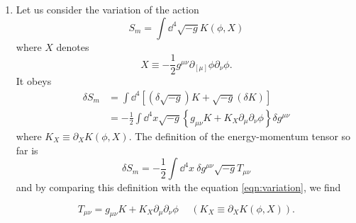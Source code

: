 \documentclass[a4paper,pdftex,10pt]{article}
\begin{document}
\maketitle

\begin{enumerate}
  \item
        Let us consider the variation of the action
        \begin{equation}
          S_{m}
          =
          \int\dd^4 \sqrt{-g}K(\phi,X)
        \end{equation}
        where $X$ denotes
        \begin{equation}
          X
          \equiv
          -
          \frac{1}{2}g^{\mu\nu}\partial_[\mu]\phi\partial_{\nu}\phi
          .
        \end{equation}
        It obeys
        \begin{align}
          \delta S_{m}
           & =
          \int\dd^4
          \left[
            (\delta\sqrt{-g})K
            +
            \sqrt{-g}(\delta K)
            \right]
          \nonumber
          \\
           & =
          -\frac{1}{2}
          \int\dd^4 x
          \sqrt{-g}
          \left\{
          g_{\mu\nu}K
          +
          K_{X}\partial_{\mu}\partial_{\nu}\phi
          \right\}
          \delta g^{\mu\nu}
          \label{eqn:variation}
        \end{align}
        where $K_{X}\equiv \partial_{X}K(\phi,X)$. The definition of the energy-momentum tensor so far is
        \begin{equation}
          \delta S_{m}
          =
          -\frac{1}{2}\int\dd^4 x\
          \delta g^{\mu\nu}\sqrt{-g}T_{\mu\nu}
          \label{eqn:dfn_energy-momentum_tensor}
        \end{equation}
        and by comparing this definition with the equation \eqref{eqn:variation}, we find
        \begin{graybox}
          \begin{equation}
            T_{\mu\nu}
            =
            g_{\mu\nu}K
            +
            K_{X}\partial_{\mu}\partial_{\nu}\phi
            \hspace{15pt}
            (K_{X}\equiv \partial_{X}K(\phi,X))
            .
          \end{equation}
        \end{graybox}


\end{enumerate}
\end{document}
